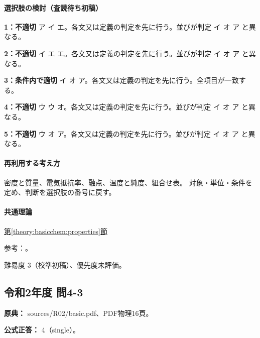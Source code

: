 \paragraph{選択肢の検討（査読待ち初稿）}\mbox{}\par

\noindent\textbf{1：不適切} ア イ エ。各文又は定義の判定を先に行う。並びが判定 イ オ ア と異なる。\par

\noindent\textbf{2：不適切} イ エ エ。各文又は定義の判定を先に行う。並びが判定 イ オ ア と異なる。\par

\noindent\textbf{3：条件内で適切} イ オ ア。各文又は定義の判定を先に行う。全項目が一致する。\par

\noindent\textbf{4：不適切} ウ ウ オ。各文又は定義の判定を先に行う。並びが判定 イ オ ア と異なる。\par

\noindent\textbf{5：不適切} ウ オ ア。各文又は定義の判定を先に行う。並びが判定 イ オ ア と異なる。\par

\paragraph{再利用する考え方} 密度と質量、電気抵抗率、融点、温度と純度、組合せ表。 対象・単位・条件を定め、判断を選択肢の番号に戻す。

\paragraph{共通理論} \hyperref[theory:basicchem:properties]{第\ref*{theory:basicchem:properties}節}

\par 参考：\cite{openstax_resistivity,chem55_properties,chem55_properties_al,chem55_properties_fe}。

\par 難易度 3（校準初稿）、優先度未評価。

\subsection{令和2年度 問4-3}
\label{q:r02-reg-basic-4-3}

\noindent\textbf{原典：} sources/R02/basic.pdf、PDF物理16頁。

\textbf{公式正答：} 4（single）。

